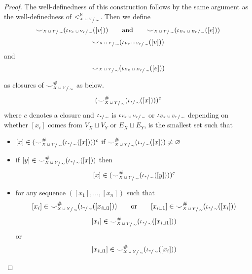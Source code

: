 \begin{proof}
	The well-definedness of this construction follows by the same argument as the well-definedness of $<_{\sfrac{X\sqcup Y}{\sim}}^{\mu}$.
	Then we define
	\ifdefined \ONECOLUMN
		\[
			{\smile}_{\sfrac{X\sqcup Y}{\sim}}(\iota_{\sfrac{V_{X} \sqcup  V_{Y}}{\sim}}([v])) \qquad \text{and} \qquad {\smile}_{\sfrac{X\sqcup Y}{\sim}}(\iota_{\sfrac{E_{X} \sqcup  E_{Y}}{\sim}}([e]))
		\]
	\else
		\[
			{\smile}_{\sfrac{X\sqcup Y}{\sim}}(\iota_{\sfrac{V_{X} \sqcup  V_{Y}}{\sim}}([v]))
		\]
		and
		\[
			{\smile}_{\sfrac{X\sqcup Y}{\sim}}(\iota_{\sfrac{E_{X} \sqcup  E_{Y}}{\sim}}([e]))
		\]
	\fi

	as closures of ${\smile}^{{\#}}_{\sfrac{X\sqcup Y}{\sim}}$ as below.
	\[
		({\smile}^{{\#}}_{\sfrac{X\sqcup Y}{\sim}}(\iota_{\sfrac{*}{\sim}}([x])))^{c}
	\]
	where $c$ denotes a closure and $\iota_{\sfrac{*}{\sim}}$ is $\iota_{\sfrac{V_{X} \sqcup  V_{Y}}{\sim}}$ or $\iota_{\sfrac{E_{X} \sqcup  E_{Y}}{\sim}}$ depending on whether $[x_i]$ comes from $V_{X} \sqcup  V_{Y}$ or $E_{X} \sqcup  E_{Y}$, is the smallest set such that
	\begin{itemize}
		\item $[x] \in ({\smile}^{{\#}}_{\sfrac{X\sqcup Y}{\sim}}(\iota_{\sfrac{*}{\sim}}([x])))^{c}$ if ${\smile}^{{\#}}_{\sfrac{X\sqcup Y}{\sim}}(\iota_{\sfrac{*}{\sim}}([x])) \not = \varnothing$
		\item if $[y] \in {\smile}^{{\#}}_{\sfrac{X\sqcup Y}{\sim}}(\iota_{\sfrac{*}{\sim}}([x]))$ then
		      \[
			      [x] \in ({\smile}^{{\#}}_{\sfrac{X\sqcup Y}{\sim}}(\iota_{\sfrac{*}{\sim}}([y])))^{c}
		      \]
		\item for any sequence $([x_1], \ldots, [x_n])$ such that
		      \ifdefined \ONECOLUMN
			      \[[x_i] \in {\smile}^{{\#}}_{\sfrac{X\sqcup Y}{\sim}}(\iota_{\sfrac{*}{\sim}}([x_{i\sqcup 1}])) \qquad \text{or} \qquad [x_{i\sqcup 1}] \in {\smile}^{{\#}}_{\sfrac{X\sqcup Y}{\sim}}(\iota_{\sfrac{*}{\sim}}([x_{i}]))\]
		      \else
			      \[
				      [x_i] \in {\smile}^{{\#}}_{\sfrac{X\sqcup Y}{\sim}}(\iota_{\sfrac{*}{\sim}}([x_{i\sqcup 1}]))
			      \] or
			      \[
				      [x_{i\sqcup 1}] \in {\smile}^{{\#}}_{\sfrac{X\sqcup Y}{\sim}}(\iota_{\sfrac{*}{\sim}}([x_{i}]))
\]
\end{itemize}
\end{proof}
